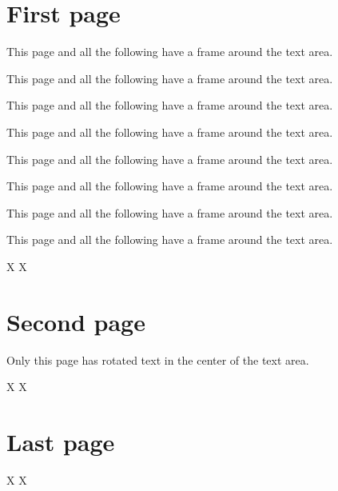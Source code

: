 \documentclass[a4paper,twoside]{article}
\begin{document}
  \section*{First page}
  

  This page and all the following have a frame around the
  text area. \par
  This page and all the following have a frame around the
  text area. \par
  This page and all the following have a frame around the
  text area. \par
  This page and all the following have a frame around the
  text area. \par
  This page and all the following have a frame around the
  text area. \par
  This page and all the following have a frame around the
  text area. \par
  This page and all the following have a frame around the
  text area. \par
  This page and all the following have a frame around the
  text area. \par

  \vfill
  X \hfill X\newpage

  \section*{Second page}


  Only this page has rotated text in the center of the text area.

  \vfill
  X \hfill X\newpage

  \section*{Last page}

  \vfill
  X \hfill X
\end{document}
